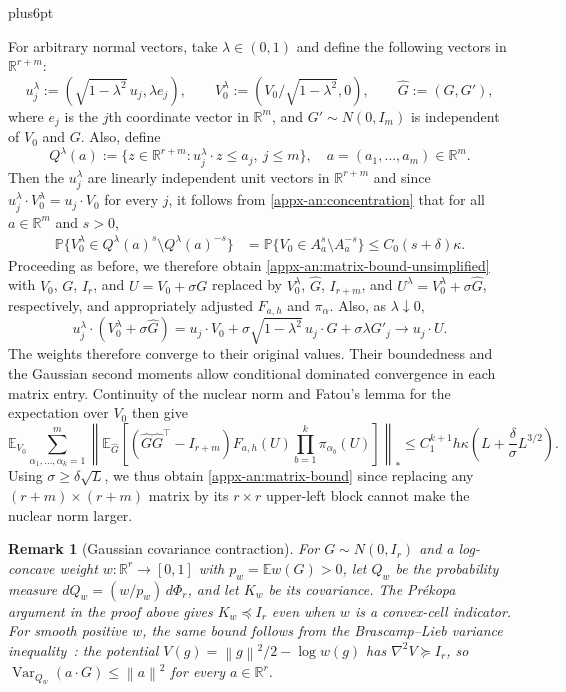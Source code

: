 \documentclass[11pt,letterpaper,twoside,leqno]{article}
\makeatletter
\theoremstyle{bookplain}
\theoremstyle{bookremark}
\newtheorem{remark}{Remark}
\renewenvironment{proof}[1][\proofname]{\par
  \pushQED{\qed}\normalfont\topsep6pt plus6pt\relax
  \trivlist\item[\hskip\labelsep\bfseries #1\@addpunct{.}]\ignorespaces
}{\popQED\endtrivlist\@endpefalse}
\newcommand{\E}{\mathbb E}
\newcommand{\R}{\mathbb R}
\newcommand{\norm}[1]{\left\lVert#1\right\rVert}
\makeatother
\begin{document}
\begin{proof}
For arbitrary normal vectors, take \(\lambda\in(0,1)\) and define the following vectors in $\R^{r+m}$:
\[
 u_j^\lambda:=(\sqrt{1-\lambda^2}\,u_j,\lambda e_j),\qquad
 V_0^\lambda:=(V_0/\sqrt{1-\lambda^2},0),\qquad
 \widehat G:=(G,G'),
\]
where \(e_j\) is the \(j\)th coordinate vector in \(\R^m\), and
\(G'\sim N(0,I_m)\) is independent of $V_0$ and $G$. Also, define
\[
Q^\lambda(a):=\{z\in\mathbb R^{r+m}:u_j^\lambda\cdot z\le a_j,\ j\le m\},\quad a=(a_1,\dots,a_m)\in\R^m.
\]
Then the \(u_j^\lambda\) are linearly independent unit vectors in $\R^{r+m}$ and
since \(u_j^\lambda\cdot V_0^\lambda=u_j\cdot V_0\) for every \(j\), it follows from \eqref{appx-an:concentration} that for all \(a\in\mathbb R^m\) and \(s>0\),
\[
\begin{aligned}
\mathbb P\{V_0^\lambda\in Q^\lambda(a)^s\setminus Q^\lambda(a)^{-s}\}
&=\mathbb P\{V_0\in A_a^s\setminus A_a^{-s}\} \le C_0(s+\delta){\kappa}.
\end{aligned}
\]
Proceeding as before, we therefore obtain \eqref{appx-an:matrix-bound-unsimplified} with $V_0$, $G$, $I_r$, and $U=V_0+\sigma G$ replaced by $V_0^{\lambda}$, $\widehat G$, $I_{r+m}$, and $U^{\lambda} = V_0^{\lambda} + \sigma \widehat G$, respectively, and appropriately adjusted $F_{a, h}$ and $\pi_{\alpha}$. Also, as \(\lambda\downarrow0\),
\[
 u_j^\lambda\cdot(V_0^\lambda+\sigma\widehat G)
 =u_j\cdot V_0+\sigma\sqrt{1-\lambda^2}\,u_j\cdot G
                  +\sigma\lambda G'_j
 \longrightarrow u_j\cdot U.
\]
The weights therefore converge to their original values. Their
boundedness and the Gaussian second moments allow conditional dominated
convergence in each matrix entry. Continuity of the nuclear norm and
Fatou's lemma for the expectation over $V_0$ then give
\[
 \E_{V_0}\sum_{\alpha_1,\ldots,\alpha_k=1}^m
 \left\|\E_{\widehat G}\left[(\widehat G\widehat G^\top-I_{r+m})F_{a, h}(U)
              \prod_{b=1}^k\pi_{\alpha_b}(U)\right]\right\|_*
 \le C_1^{k+1}h{\kappa\left(L+\frac\delta\sigma L^{3/2}\right)}.
\]
Using \(\sigma\ge\delta\sqrt L\), we thus obtain \eqref{appx-an:matrix-bound} since replacing any $(r+m)\times(r+m)$ matrix by its $r\times r$ upper-left block cannot make the nuclear norm larger.
\par\endgroup
\end{proof}

\begin{remark}[Gaussian covariance contraction]\label{appx-rem:covariance-contraction}
For \(G\sim N(0,I_r)\) and a log-concave weight \(w:\R^r\to[0,1]\) with
\(p_w=\E w(G)>0\), let \(Q_w\) be the probability measure
\(dQ_w=(w/p_w)\,d\Phi_r\), and let \(K_w\) be its covariance.
The Pr\'ekopa argument in the proof above gives \(K_w\preceq I_r\)
even when \(w\) is a convex-cell indicator. For smooth positive
\(w\), the same bound follows from the Brascamp--Lieb variance
inequality~\cite{BrascampLieb1976}: the potential
\(V(g)=\norm g^2/2-\log w(g)\) has \(\nabla^2V\succeq I_r\),
so \(\operatorname{Var}_{Q_w}(a\cdot G)\le\norm a^2\) for every
\(a\in\R^r\).
\end{remark}
\end{document}
